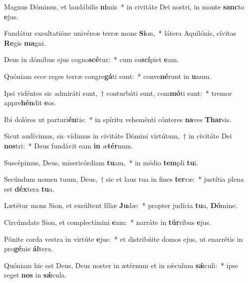 \item Magnus Dóminus, et laudábilis \textbf{ni}mis~* in civitáte Dei nostri, in monte \textbf{sanc}to \textbf{e}jus.
\item Fundátur exsultatióne univérsæ terræ mons \textbf{Si}on,~* látera Aquilónis, cívitas \textbf{Re}gis \textbf{ma}gni.
\item Deus in dómibus ejus cogno\textbf{scé}tur:~* cum su\textbf{scí}piet \textbf{e}am.
\item Quóniam ecce reges terræ congre\textbf{gá}ti sunt:~* conve\textbf{né}runt in \textbf{u}num.
\item Ipsi vidéntes sic admiráti sunt,~† conturbáti sunt, com\textbf{mó}ti sunt:~* tremor appre\textbf{hén}dit \textbf{e}os.
\item Ibi dolóres ut parturi\textbf{én}tis:~* in spíritu veheménti cónteres \textbf{na}ves \textbf{Thar}sis.
\item Sicut audívimus, sic vídimus in civitáte Dómini virtútum,~† in civitáte Dei \textbf{nos}tri:~* Deus fundávit eam \textbf{in} æ\textbf{tér}num.
\item Suscépimus, Deus, misericórdiam \textbf{tu}am,~* in médio \textbf{tem}pli \textbf{tu}i.
\item Secúndum nomen tuum, Deus,~† sic et laus tua in fines \textbf{ter}ræ:~* justítia plena est \textbf{déx}tera \textbf{tu}a.
\item Lætétur mons Sion, et exsúltent fíliæ \textbf{Ju}dæ:~* propter judícia \textbf{tu}a, \textbf{Dó}mine.
\item Circúmdate Sion, et complectímini \textbf{e}am:~* narráte in \textbf{túr}ribus \textbf{e}jus.
\item Pónite corda vestra in virtúte \textbf{e}jus:~* et distribúite domos ejus, ut enarrétis in pro\textbf{gé}nie \textbf{ál}tera.
\item Quóniam hic est Deus, Deus noster in ætérnum et in sǽculum \textbf{sǽ}culi:~* ipse reget \textbf{nos} in \textbf{sǽ}cula.
